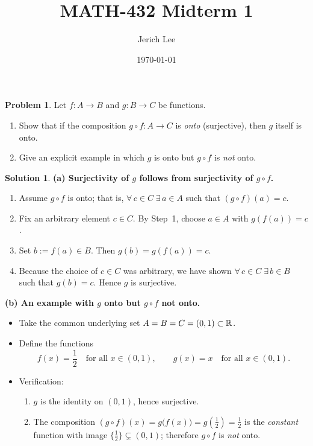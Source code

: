 \documentclass[12pt]{article}
\title{MATH-432 Midterm 1}
\author{Jerich Lee}
\date{\today}
\theoremstyle{definition} %
\newtheorem{solution}{Solution}
\newtheorem{problem}{Problem}
\theoremstyle{plain} %
\begin{document}
\maketitle
\begin{problem}
  Let \(f\colon A\to B\) and \(g\colon B\to C\) be functions.
  
  \begin{enumerate}[label=\textup{(\alph*)}]
    \item Show that if the composition \(g\circ f\colon A\to C\) is \emph{onto} (surjective), then \(g\) itself is onto.
    \item Give an explicit example in which \(g\) is onto but \(g\circ f\) is \emph{not} onto.
  \end{enumerate}
  \end{problem}
  
  \begin{solution}
  \textbf{(a)  Surjectivity of \(g\) follows from surjectivity of \(g\circ f\).}
  
  \begin{enumerate}
    \item[] Assume \(g\circ f\) is onto; that is,  
          \(\forall\,c\in C\;\exists\,a\in A\) such that \((g\circ f)(a)=c\).
    \item[] Fix an arbitrary element \(c\in C\).  
          By Step~1, choose \(a\in A\) with \(g(f(a))=c\).
    \item[] Set \(b:=f(a)\in B\).  
          Then \(g(b)=g(f(a))=c\).
    \item[] Because the choice of \(c\in C\) was arbitrary,  
          we have shown \(\forall\,c\in C\;\exists\,b\in B\) such that \(g(b)=c\).  
          Hence \(g\) is surjective.
  \end{enumerate}
  
  \medskip
  \textbf{(b)  An example with \(g\) onto but \(g\circ f\) not onto.}
  
  \begin{itemize}
    \item Take the common underlying set  
          \(A=B=C=(0,1)\subset\Bbb R\).
    \item Define the functions
          \[
              f(x)=\frac12
              \quad\text{for all }x\in(0,1),
              \qquad
              g(x)=x
              \quad\text{for all }x\in(0,1).
          \]
    \item Verification:
          \begin{enumerate}[label=\textbullet]
            \item \(g\) is the identity on \((0,1)\), hence surjective.
            \item The composition \((g\circ f)(x)=g\!\bigl(f(x)\bigr)=g\!\left(\tfrac12\right)=\tfrac12\)
                  is the \emph{constant} function with image \(\{\tfrac12\}\subsetneq(0,1)\);  
                  therefore \(g\circ f\) is \emph{not} onto.
          \end{enumerate}
  \end{itemize}
  \end{solution}
\end{document}
